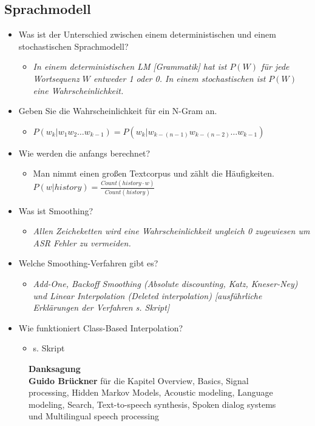 \documentclass[11pt]{article}
\begin{document}
\subsection{Sprachmodell}
\begin{itemize}
\item Was ist der Unterschied zwischen einem deterministischen und einem stochastischen Sprachmodell?
\begin{itemize}
\item \emph{In einem deterministischen LM [Grammatik] hat ist $P(W)$ für jede Wortsequenz $W$ entweder 1 oder 0. In einem stochastischen ist $P(W)$ eine Wahrscheinlichkeit.}
\end{itemize}
\item Geben Sie die Wahrscheinlichkeit für ein N-Gram an.
\begin{itemize}
\item $P(w_k | w_1w_2\dots w_{k-1}) = P(w_k | w_{k-(n-1)}w_{k-(n-2)}\dots w_{k-1})$
\end{itemize}
\item Wie werden die anfangs berechnet? 
\begin{itemize}
\item Man nimmt einen großen Textcorpus und zählt die Häufigkeiten. $P(w|history) = \frac{Count(history \cdot w)}{Count(history)}$
\end{itemize}
\item Was ist Smoothing?
\begin{itemize}
\item \emph{Allen Zeicheketten wird eine Wahrscheinlichkeit ungleich 0 zugewiesen um ASR Fehler zu vermeiden.}
\end{itemize}
\item Welche Smoothing-Verfahren gibt es?
\begin{itemize}
\item \emph{Add-One, Backoff Smoothing (Absolute discounting, Katz, Kneser-Ney) und Linear Interpolation (Deleted interpolation) [ausführliche Erklärungen der Verfahren s. Skript]}
\end{itemize}
\item Wie funktioniert Class-Based Interpolation? 
\begin{itemize}
\item s. Skript
\end{itemize}
\end{itemize}

\newpage

\begin{figure}
\centering
\textbf{Danksagung} \\
\textbf{Guido Brückner} für die Kapitel Overview, Basics, Signal processing, Hidden Markov Models, Acoustic modeling, Language modeling, Search, Text-to-speech synthesis, Spoken dialog systems und Multilingual speech processing
\end{figure}
\end{document}
